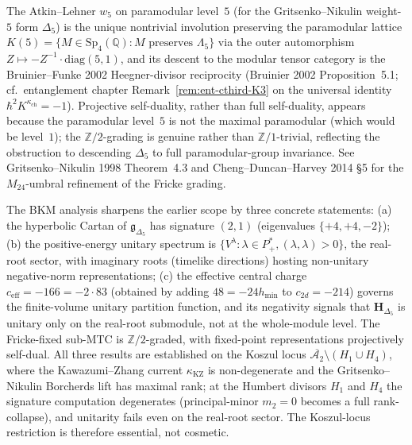 \begin{remark}
\label{rem:stqp-fricke-scope}
The Atkin--Lehner $w_5$ on paramodular level~$5$ (for the
Gritsenko--Nikulin weight-$5$ form $\Delta_5$) is the unique
nontrivial involution preserving the paramodular lattice
$K(5) = \{M \in \mathrm{Sp}_4(\mathbb Q) : M \text{ preserves }
\Lambda_{5}\}$ via the outer automorphism
$Z \mapsto -Z^{-1}\cdot\mathrm{diag}(5,1)$, and its descent to
the modular tensor category is the Bruinier--Funke 2002
Heegner-divisor reciprocity (Bruinier 2002 Proposition~5.1;
cf.\ entanglement chapter Remark~\ref{rem:ent-cthird-K3}
on the universal identity $\hbar^2 K^{\kappa_{\mathrm{ch}}} = -1$).
Projective self-duality, rather than full self-duality, appears
because the paramodular level~$5$ is not the maximal paramodular
(which would be level~$1$); the $\mathbb Z/2$-grading is genuine
rather than $\mathbb Z/1$-trivial, reflecting the obstruction
to descending $\Delta_5$ to full paramodular-group invariance.
See Gritsenko--Nikulin 1998 Theorem~4.3 and
Cheng--Duncan--Harvey 2014 \S 5 for the $M_{24}$-umbral
refinement of the Fricke grading.
\end{remark}

\begin{remark}
\label{rem:stqp-synthesis}
The BKM analysis sharpens the earlier scope by three concrete
statements: (a) the hyperbolic Cartan of $\mathfrak g_{\Delta_5}$
has signature $(2, 1)$ (eigenvalues $\{+4, +4, -2\}$);
(b) the positive-energy unitary spectrum is
$\{V^\lambda : \lambda \in P^*_+, (\lambda, \lambda) > 0\}$, the
real-root sector, with imaginary roots (timelike directions)
hosting non-unitary negative-norm representations;
(c) the effective central charge $c_{\mathrm{eff}} = -166 = -2\cdot 83$
(obtained by adding $48 = -24 h_{\min}$ to $c_{2d} = -214$)
governs the finite-volume unitary partition function, and its
negativity signals that $\mathbf H_{\Delta_5}$ is unitary only
on the real-root submodule, not at the whole-module level. The
Fricke-fixed sub-MTC is $\mathbb Z/2$-graded, with fixed-point
representations projectively self-dual. All three results are
established on the Koszul locus
$\overline{\mathcal A_2}\setminus(H_1\cup H_4)$, where the
Kawazumi--Zhang current $\kappa_{\mathrm{KZ}}$ is non-degenerate
and the Gritsenko--Nikulin Borcherds lift has maximal rank; at
the Humbert divisors $H_1$ and $H_4$ the signature computation
degenerates (principal-minor $m_2 = 0$ becomes a full
rank-collapse), and unitarity fails even on the real-root
sector. The Koszul-locus restriction is therefore essential,
not cosmetic.
\end{remark}

